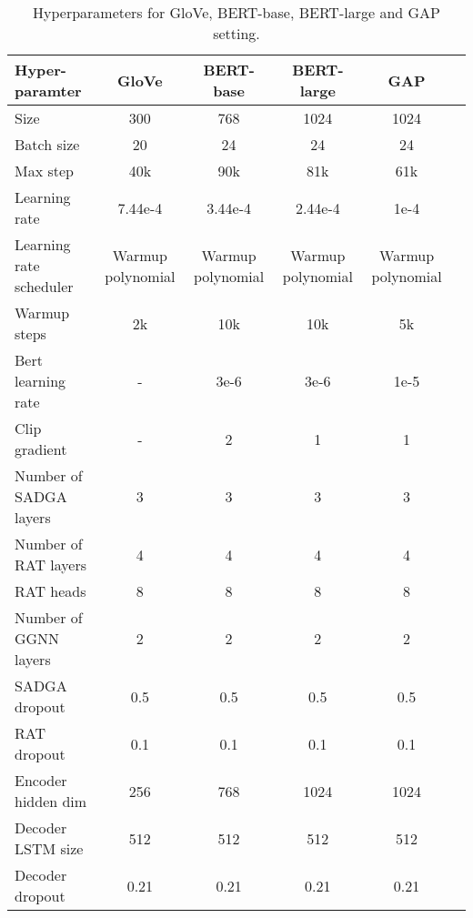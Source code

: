 \documentclass{article}
\begin{document}
\begin{table*}[hbt]
    \setlength\tabcolsep{1pt}
    \caption{Hyperparameters for GloVe, BERT-base, BERT-large and GAP setting.}
    \label{Hyper_parameters} 
    \renewcommand\arraystretch{1.1}
    \centering
    \footnotesize
    \begin{tabular}{lccccc}
        \toprule
        \textbf{Hyper-paramter}        & \textbf{GloVe}     & \textbf{BERT-base}         & \textbf{BERT-large}      & \textbf{GAP}          \\ 
        \hline\hline
        Size                     & 300    & 768            & 1024           & 1024                  \\
        Batch size                & 20   & 24             & 24             & 24                  \\
        Max step                & 40k    & 90k            & 81k            & 61k                  \\
        Learning rate           & 7.44e-4    & 3.44e-4        & 2.44e-4        & 1e-4                  \\
        Learning rate scheduler  & Warmup polynomial   & Warmup polynomial               & Warmup polynomial           & Warmup polynomial                  \\
        Warmup steps             & 2k    & 10k            & 10k            & 5k                  \\
        Bert learning rate       & -   & 3e-6        & 3e-6        & 1e-5                  \\
        Clip gradient            & -    & 2              & 1              & 1                  \\
        Number of SADGA layers    & 3  & 3              & 3              & 3                  \\
        Number of RAT layers    & 4    & 4              & 4              & 4                  \\
        RAT heads               & 8   & 8              & 8              & 8                  \\
        Number of GGNN layers    & 2   & 2              & 2              & 2                  \\
        SADGA dropout            & 0.5   & 0.5            & 0.5            & 0.5                  \\
        RAT dropout             & 0.1    & 0.1            & 0.1            & 0.1                  \\
        Encoder hidden dim       & 256   & 768            & 1024           & 1024                  \\
        Decoder LSTM size          & 512    & 512            & 512            & 512                  \\
        Decoder dropout          & 0.21  & 0.21            & 0.21            & 0.21                  \\
        
        \bottomrule 
    \end{tabular}
\end{table*}
\end{document}
